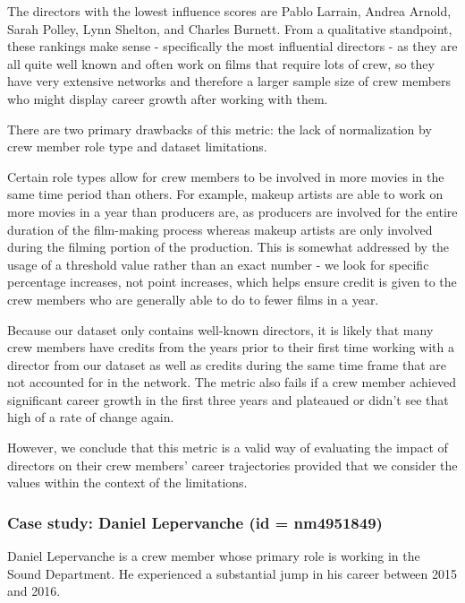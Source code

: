 \documentclass[12pt]{article}
\begin{document}
The directors with the lowest influence scores are Pablo Larrain, Andrea Arnold, Sarah Polley, Lynn Shelton, and Charles Burnett.  From a qualitative standpoint, these rankings make sense - specifically the most influential directors - as they are all quite well known and often work on films that require lots of crew, so they have very extensive networks and therefore a larger sample size of crew members who might display career growth after working with them. 

There are two primary drawbacks of this metric: the lack of normalization by crew member role type and dataset limitations.

Certain role types allow for crew members to be involved in more movies in the same time period than others. For example, makeup artists are able to work on more movies in a year than producers are, as producers are involved for the entire duration of the film-making process whereas makeup artists are only involved during the filming portion of the production. This is somewhat addressed by the usage of a threshold value rather than an exact number - we look for specific percentage increases, not point increases, which helps ensure credit is given to the crew members who are generally able to do to fewer films in a year. 

Because our dataset only contains well-known directors, it is likely that many crew members have credits from the years prior to their first time working with a director from our dataset as well as credits during the same time frame that are not accounted for in the network. The metric also fails if a crew member achieved significant career growth in the first three years and plateaued or didn't see that high of a rate of change again. 

However, we conclude that this metric is a valid way of evaluating the impact of directors on their crew members' career trajectories provided that we consider the values within the context of the limitations. 

\subsubsection*{Case study: Daniel Lepervanche (id = nm4951849)}

Daniel Lepervanche is a crew member whose primary role is working in the Sound Department. He experienced a substantial jump in his career between 2015 and 2016. 
\end{document}
